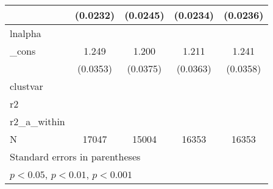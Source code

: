{\begin{tabular}{l*{4}{c}}
            &    (0.0232)         &    (0.0245)         &    (0.0234)         &    (0.0236)         \\
\hline
lnalpha     &                     &                     &                     &                     \\
\_cons      &       1.249\sym{***}&       1.200\sym{***}&       1.211\sym{***}&       1.241\sym{***}\\
            &    (0.0353)         &    (0.0375)         &    (0.0363)         &    (0.0358)         \\
\hline
clustvar    &                     &                     &                     &                     \\
r2          &                     &                     &                     &                     \\
r2\_a\_within &                     &                     &                     &                     \\
N           &       17047         &       15004         &       16353         &       16353         \\
\hline\hline
\multicolumn{5}{l}{\footnotesize Standard errors in parentheses}\\
\multicolumn{5}{l}{\footnotesize \sym{*} \(p<0.05\), \sym{**} \(p<0.01\), \sym{***} \(p<0.001\)}\\
\end{tabular}
}
